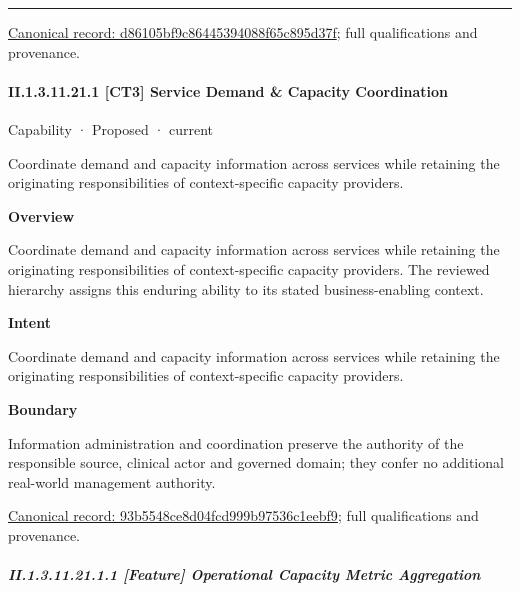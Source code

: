 \medskip\hrule\medskip

{\footnotesize \href{../../../../continuum/strategy/capability/d86105bf9c86445394088f65c895d37f.md}{Canonical record: d86105bf9c86445394088f65c895d37f}; full qualifications and provenance.}\par
\paragraph*{II.1.3.11.21.1 [CT3] Service Demand \& Capacity Coordination}
\label{navigation:II.1.3.11.21.1}

\label{element:93b5548ce8d04fcd999b97536c1eebf9}
{\small Capability · Proposed · current}\par

Coordinate demand and capacity information across services while retaining the originating responsibilities of context-specific capacity providers.



\textbf{Overview}



Coordinate demand and capacity information across services while retaining the originating responsibilities of context-specific capacity providers. The reviewed hierarchy assigns this enduring ability to its stated business-enabling context.



\textbf{Intent}



Coordinate demand and capacity information across services while retaining the originating responsibilities of context-specific capacity providers.



\textbf{Boundary}



Information administration and coordination preserve the authority of the responsible source, clinical actor and governed domain; they confer no additional real-world management authority.


{\footnotesize \href{../../../../continuum/strategy/capability/93b5548ce8d04fcd999b97536c1eebf9.md}{Canonical record: 93b5548ce8d04fcd999b97536c1eebf9}; full qualifications and provenance.}\par
\subparagraph*{II.1.3.11.21.1.1 [Feature] Operational Capacity Metric Aggregation}
\label{navigation:II.1.3.11.21.1.1}

